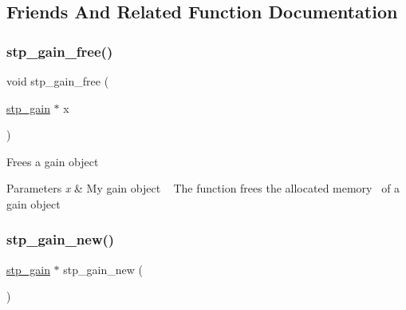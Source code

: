 \subsection{Friends And Related Function Documentation}
\mbox{\label{structstp__gain_ab36b939e4336809ad301f890303d98f9}} 
\subsubsection{\texorpdfstring{stp\+\_\+gain\+\_\+free()}{stp\_gain\_free()}}
{\footnotesize\ttfamily void stp\+\_\+gain\+\_\+free (\begin{DoxyParamCaption}\item[{\hyperlink{structstp__gain}{stp\+\_\+gain} $\ast$}]{x }\end{DoxyParamCaption})\hspace{0.3cm}{\ttfamily [related]}}



Frees a gain object~\newline
 


\begin{DoxyParams}{Parameters}
{\em x} & My gain object ~\newline
 The function frees the allocated memory~\newline
 of a gain object \\
\hline
\end{DoxyParams}
\mbox{\label{structstp__gain_a0979540c2a80ff589d209066faa0a5e9}} 
\subsubsection{\texorpdfstring{stp\+\_\+gain\+\_\+new()}{stp\_gain\_new()}}
{\footnotesize\ttfamily \hyperlink{structstp__gain}{stp\+\_\+gain} $\ast$ stp\+\_\+gain\+\_\+new (\begin{DoxyParamCaption}{ }\end{DoxyParamCaption})\hspace{0.3cm}{\ttfamily [related]}}



